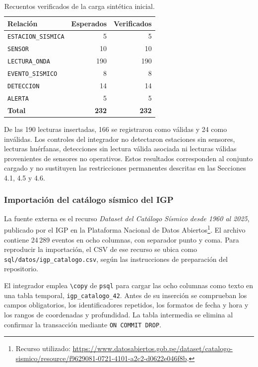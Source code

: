 \documentclass[12pt,a4paper]{article}
\begin{document}
\begin{table}[H]
\centering
\begin{tabular}{lrr}
\toprule
\textbf{Relación} & \textbf{Esperados} & \textbf{Verificados} \\
\midrule
\texttt{ESTACION\_SISMICA} & 5 & 5 \\
\texttt{SENSOR} & 10 & 10 \\
\texttt{LECTURA\_ONDA} & 190 & 190 \\
\texttt{EVENTO\_SISMICO} & 8 & 8 \\
\texttt{DETECCION} & 14 & 14 \\
\texttt{ALERTA} & 5 & 5 \\
\midrule
\textbf{Total} & \textbf{232} & \textbf{232} \\
\bottomrule
\end{tabular}
\caption{Recuentos verificados de la carga sintética inicial.}
\label{tab:carga-inicial-42}
\end{table}

De las 190 lecturas insertadas, 166 se registraron como válidas y 24
como inválidas. Los controles del integrador no detectaron estaciones
sin sensores, lecturas huérfanas, detecciones sin lectura válida
asociada ni lecturas válidas provenientes de sensores no operativos.
Estos resultados corresponden al conjunto cargado y no sustituyen las
restricciones permanentes descritas en las Secciones 4.1, 4.5 y 4.6.

\subsubsection*{Importación del catálogo sísmico del IGP}

La fuente externa es el recurso \emph{Dataset del Catálogo Sísmico desde
1960 al 2025}, publicado por el IGP en la Plataforma Nacional de Datos
Abiertos\footnote{Recurso utilizado:
\url{https://www.datosabiertos.gob.pe/dataset/catalogo-sismico/resource/f9629081-0721-4101-a2c2-d0622e046f8b}.}.
El archivo contiene 24\,289 eventos en ocho columnas, con separador
punto y coma. Para reproducir la importación, el CSV de ese recurso se
ubica como \texttt{sql/datos/igp\_catalogo.csv}, según las instrucciones
de preparación del repositorio.

El integrador emplea \texttt{\textbackslash copy} de \texttt{psql}
para cargar las ocho columnas como texto en una tabla temporal,
\texttt{igp\_catalogo\_42}. Antes de su inserción se comprueban los
campos obligatorios, los identificadores repetidos, los formatos de
fecha y hora y los rangos de coordenadas y profundidad. La tabla
intermedia se elimina al confirmar la transacción mediante
\texttt{ON COMMIT DROP}.
\end{document}
